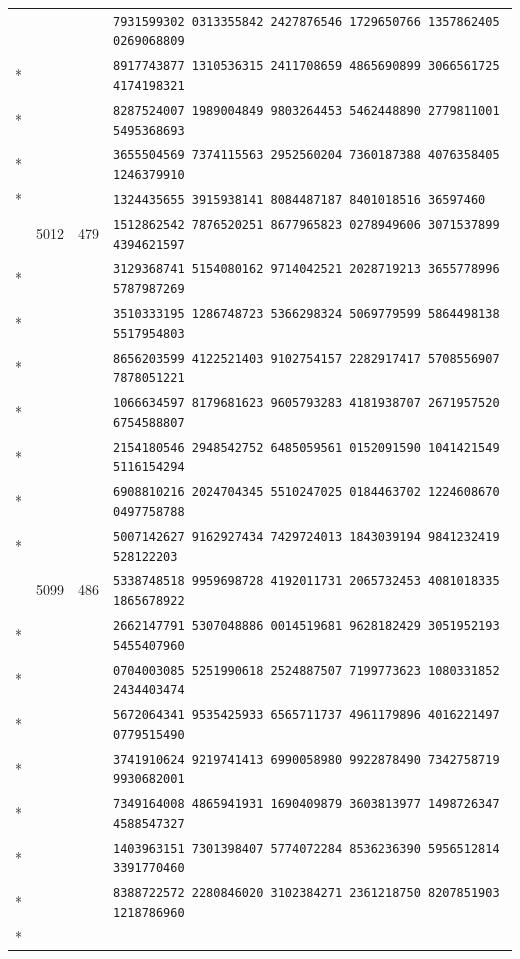 \documentclass[10pt]{article}
\begin{document}
\begin{longtable}{@{}r@{\quad}r@{\quad}r@{\quad}l@{}}
 & &  & \texttt{7931599302 0313355842 2427876546 1729650766 1357862405 0269068809}\\*
 & &  & \texttt{8917743877 1310536315 2411708659 4865690899 3066561725 4174198321}\\*
 & &  & \texttt{8287524007 1989004849 9803264453 5462448890 2779811001 5495368693}\\*
 & &  & \texttt{3655504569 7374115563 2952560204 7360187388 4076358405 1246379910}\\*
 & &  & \texttt{1324435655 3915938141 8084487187 8401018516 36597460}\\
\addlinespace[2pt]
91 & 5012 & 479 & \texttt{1512862542 7876520251 8677965823 0278949606 3071537899 4394621597}\\*
 & &  & \texttt{3129368741 5154080162 9714042521 2028719213 3655778996 5787987269}\\*
 & &  & \texttt{3510333195 1286748723 5366298324 5069779599 5864498138 5517954803}\\*
 & &  & \texttt{8656203599 4122521403 9102754157 2282917417 5708556907 7878051221}\\*
 & &  & \texttt{1066634597 8179681623 9605793283 4181938707 2671957520 6754588807}\\*
 & &  & \texttt{2154180546 2948542752 6485059561 0152091590 1041421549 5116154294}\\*
 & &  & \texttt{6908810216 2024704345 5510247025 0184463702 1224608670 0497758788}\\*
 & &  & \texttt{5007142627 9162927434 7429724013 1843039194 9841232419 528122203}\\
\addlinespace[2pt]
92 & 5099 & 486 & \texttt{5338748518 9959698728 4192011731 2065732453 4081018335 1865678922}\\*
 & &  & \texttt{2662147791 5307048886 0014519681 9628182429 3051952193 5455407960}\\*
 & &  & \texttt{0704003085 5251990618 2524887507 7199773623 1080331852 2434403474}\\*
 & &  & \texttt{5672064341 9535425933 6565711737 4961179896 4016221497 0779515490}\\*
 & &  & \texttt{3741910624 9219741413 6990058980 9922878490 7342758719 9930682001}\\*
 & &  & \texttt{7349164008 4865941931 1690409879 3603813977 1498726347 4588547327}\\*
 & &  & \texttt{1403963151 7301398407 5774072284 8536236390 5956512814 3391770460}\\*
 & &  & \texttt{8388722572 2280846020 3102384271 2361218750 8207851903 1218786960}\\*

\end{longtable}
\end{document}
